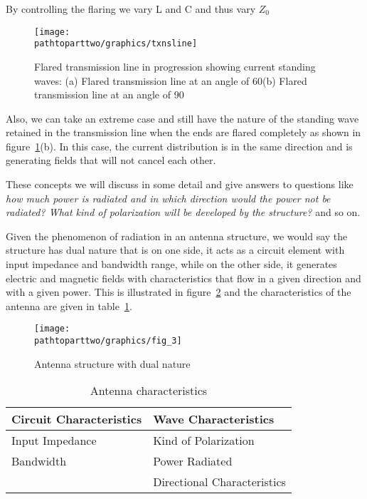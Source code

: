 By controlling the flaring we vary L and C and thus vary $Z_0$
\begin{figure}[h]
\centering
\texttt{[image: \\pathtoparttwo/graphics/txnsline]}
\caption{Flared transmission line in progression showing current standing waves: (a) Flared transmission line at an angle of 60\textdegree (b) Flared transmission line at an angle of 90\textdegree}
\label{fig:flaredtxnsline}
\end{figure}

Also, we can take an extreme case and still have the nature of the standing wave retained in the transmission line when the ends are flared completely as shown in figure~\ref{fig:flaredtxnsline}(b). In this case, the current distribution is in the same direction and is generating fields that will not cancel each other.

These concepts we will discuss in some detail and give answers to questions like \emph{how much power is radiated and in which direction would the power not be radiated? What kind of polarization will be developed by the structure?} and so on.

Given the phenomenon of radiation in an antenna structure, we would say the structure has dual nature that is on one side, it acts as a circuit element with input impedance and bandwidth range, while on the other side, it generates electric and magnetic fields with characteristics that flow in a given direction and with a given power. This is illustrated in figure~\ref{fig:antennadualnature} and the characteristics of the antenna are given in table~\ref{tab:antennachar}.
\begin{figure}[h]
\centering
\texttt{[image: \\pathtoparttwo/graphics/fig\_3]}
\caption{Antenna structure with dual nature}
\label{fig:antennadualnature}
\end{figure}
\begin{table}[h]
\centering
\caption{Antenna characteristics}
\begin{tabular}{|l|l|}
\hline
\textbf{Circuit Characteristics} & \textbf{Wave Characteristics} \\
\hline
Input Impedance & Kind of Polarization \\
\hline
Bandwidth & Power Radiated \\
\hline
  & Directional Characteristics \\
\hline
\end{tabular}
\label{tab:antennachar}
\end{table}

